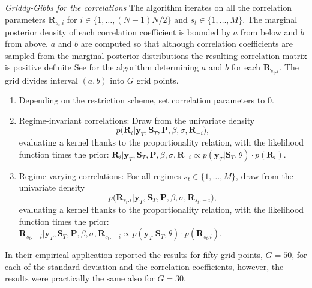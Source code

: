 \documentclass[final,3p,authoryear]{elsarticle}
\begin{document}
\begin{al}\label{al:Griddy-corr} \textit{Griddy-Gibbs for the correlations} The algorithm iterates on all the correlation parameters $\mathbf{R}_{s_t.i}$ for $i\in\{1,\dots,(N-1)N/2\}$ and $s_t\in\{1,\dots,M\}$. The marginal posterior density of each correlation coefficient is bounded by $a$ from below and $b$ from above. $a$ and $b$ are computed so that although correlation coefficients are sampled from the marginal posterior distributions the resulting correlation matrix is positive definite See \cite{Barnard2000} for the algorithm determining $a$ and $b$ for each $\mathbf{R}_{s_t.i}$. The grid divides interval $(a,b)$ into $G$ grid points. 
	\begin{enumerate}
		\item  Depending on the restriction scheme, set correlation parameters to 0. 
		\item  Regime-invariant correlations: Draw from the univariate density 
		\begin{equation*}
		p \bigl( \mathbf{R}_{i} \big| \mathbf{y}_T , \mathbf{S}_T , \mathbf{P}, \beta, \sigma,\mathbf{R}_{-i} \bigr),
		\end{equation*}
	   evaluating a kernel thanks to the proportionality relation, with the likelihood function times the prior: $\mathbf{R}_{i}| \mathbf{y}_T , \mathbf{S}_T , \mathbf{P}, \beta, \sigma,\mathbf{R}_{-i} \propto  p( \mathbf{y}_T | \mathbf{S}_T , \theta) \cdot p(\mathbf{R}_{i})$.
		\item Regime-varying correlations: For all regimes $s_t\in\{1,\dots,M\}$, draw from the univariate density
		\begin{equation*}
		p \bigl( \mathbf{R}_{s_t.i} \big| \mathbf{y}_T , \mathbf{S}_T , \mathbf{P}, \beta, \sigma,\mathbf{R}_{s_t.-i} \bigr),
		\end{equation*}
		evaluating a kernel thanks to the proportionality relation, with the likelihood function times the prior: $\mathbf{R}_{s_t.-i} | \mathbf{y}_T , \mathbf{S}_T , \mathbf{P}, \beta, \sigma,\mathbf{R}_{s_t.-i} \propto  p( \mathbf{y}_T | \mathbf{S}_T , \theta ) \cdot p(\mathbf{R}_{s_t.i})$.  
	\end{enumerate}
\end{al}   

In their empirical application \cite{Droumaguet2016} reported the results for fifty grid points, $G=50$, for each of the standard deviation and the correlation coefficients, however, the results were practically the same also for $G=30$.
\end{document}

